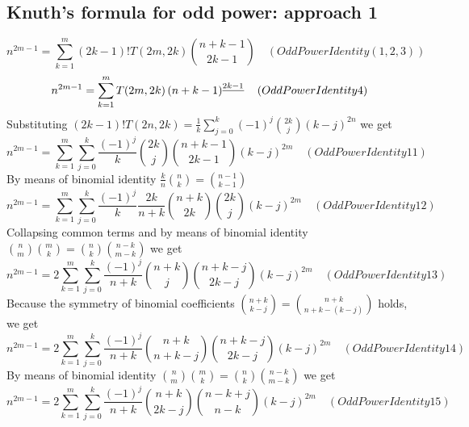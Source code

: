 \subsection{Knuth's formula for odd power: approach 1}\label{subsec:knuth's-formula-for-odd-power-approach-1}
\begin{equation*}
    n^{2m-1} = \sum_{k=1}^{m} (2k-1)! T(2m,2k) \binom{n+k-1}{2k-1} \quad
    (OddPowerIdentity(1,2,3))
\end{equation*}
\begin{equation*}
    n^{2m-1} = \sum_{k=1}^{m} T(2m,2k) \left(n+k-1 \right)^{\underline{2k-1}} \quad
    (OddPowerIdentity4)
\end{equation*}
Substituting $(2k-1)!T(2n,2k) = \frac{1}{k} \sum_{j=0}^{k} (-1)^j \binom{2k}{j} (k-j)^{2n}$ we get
\begin{equation*}
    n^{2m-1} = \sum_{k=1}^{m} \sum_{j=0}^{k} \frac{(-1)^j}{k} \binom{2k}{j} \binom{n+k-1}{2k-1} (k-j)^{2m} \quad
    (OddPowerIdentity11)
\end{equation*}
By means of binomial identity $\frac{k}{n} \binom{n}{k} = \binom{n-1}{k-1}$
\begin{equation*}
    n^{2m-1} = \sum_{k=1}^{m} \sum_{j=0}^{k} \frac{(-1)^{j}}{k} \frac{2k}{n+k} \binom{n+k}{2k} \binom{2k}{j} (k-j)^{2m} \quad
    (OddPowerIdentity12)
\end{equation*}
Collapsing common terms and by means of binomial identity $\binom{n}{m} \binom{m}{k} = \binom{n}{k} \binom{n-k}{m-k}$ we get
\begin{equation*}
    n^{2m-1} = 2\sum_{k=1}^{m} \sum_{j=0}^{k} \frac{(-1)^{j}}{n+k} \binom{n+k}{j} \binom{n+k-j}{2k-j} (k-j)^{2m} \quad
    (OddPowerIdentity13)
\end{equation*}
Because the symmetry of binomial coefficients $\binom{n+k}{k-j} = \binom{n+k}{n+k-(k-j)}$ holds, we get
\begin{equation*}
    n^{2m-1} = 2\sum_{k=1}^{m} \sum_{j=0}^{k} \frac{(-1)^{j}}{n+k} \binom{n+k}{n+k-j} \binom{n+k-j}{2k-j} (k-j)^{2m} \quad
    (OddPowerIdentity14)
\end{equation*}
By means of binomial identity $\binom{n}{m} \binom{m}{k} = \binom{n}{k} \binom{n-k}{m-k}$ we get
\begin{equation*}
    n^{2m-1} = 2\sum_{k=1}^{m} \sum_{j=0}^{k} \frac{(-1)^{j}}{n+k} \binom{n+k}{2k-j} \binom{n-k+j}{n-k} (k-j)^{2m} \quad
    (OddPowerIdentity15)
\end{equation*}